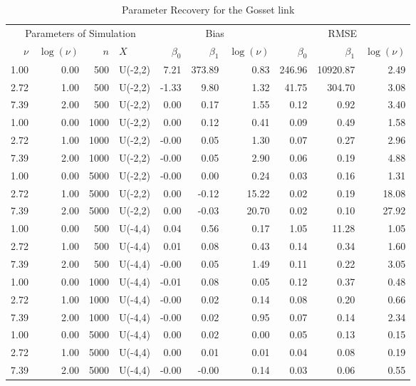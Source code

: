 \documentclass[a4paper,10 pt]{article}
\begin{document}
\begin{table}[ht]
\begin{center}
\caption{Parameter Recovery for the Gosset link}
\label{gossettable}
\begin{tabular}{rrrlrrrrrr}
  \toprule
\multicolumn{4}{c}{Parameters of Simulation} & 	\multicolumn{3}{c}{Bias} & \multicolumn{3}{c}{RMSE} \\ \cmidrule(r){1-4} \cmidrule(rl){5-7} \cmidrule(l){8-10}  
$\nu$ & $\log(\nu)$ & $n$ & $X$ & $  \beta_0$ &   $\beta_1$ &   $\log(\nu)$ & $   \beta_0$ &    $\beta_1$ &    $\log(\nu)$ \\ 
  \midrule
1.00 & 0.00 & 500 & U(-2,2) & 7.21 & 373.89 & 0.83 & 246.96 & 10920.87 & 2.49 \\ 
  2.72 & 1.00 & 500 & U(-2,2) & -1.33 & 9.80 & 1.32 & 41.75 & 304.70 & 3.08 \\ 
  7.39 & 2.00 & 500 & U(-2,2) & 0.00 & 0.17 & 1.55 & 0.12 & 0.92 & 3.40 \\ 
  1.00 & 0.00 & 1000 & U(-2,2) & 0.00 & 0.12 & 0.41 & 0.09 & 0.49 & 1.58 \\ 
  2.72 & 1.00 & 1000 & U(-2,2) & -0.00 & 0.05 & 1.30 & 0.07 & 0.27 & 2.96 \\ 
  7.39 & 2.00 & 1000 & U(-2,2) & -0.00 & 0.05 & 2.90 & 0.06 & 0.19 & 4.88 \\ 
  1.00 & 0.00 & 5000 & U(-2,2) & -0.00 & 0.00 & 0.24 & 0.03 & 0.16 & 1.31 \\ 
  2.72 & 1.00 & 5000 & U(-2,2) & 0.00 & -0.12 & 15.22 & 0.02 & 0.19 & 18.08 \\ 
  7.39 & 2.00 & 5000 & U(-2,2) & 0.00 & -0.03 & 20.70 & 0.02 & 0.10 & 27.92 \\ 
  1.00 & 0.00 & 500 & U(-4,4) & 0.04 & 0.56 & 0.17 & 1.05 & 11.28 & 1.05 \\ 
  2.72 & 1.00 & 500 & U(-4,4) & 0.01 & 0.08 & 0.43 & 0.14 & 0.34 & 1.60 \\ 
  7.39 & 2.00 & 500 & U(-4,4) & -0.00 & 0.05 & 1.49 & 0.11 & 0.22 & 3.05 \\ 
  1.00 & 0.00 & 1000 & U(-4,4) & -0.01 & 0.08 & 0.05 & 0.12 & 0.37 & 0.48 \\ 
  2.72 & 1.00 & 1000 & U(-4,4) & -0.00 & 0.02 & 0.14 & 0.08 & 0.20 & 0.66 \\ 
  7.39 & 2.00 & 1000 & U(-4,4) & -0.00 & 0.02 & 0.95 & 0.07 & 0.14 & 2.34 \\ 
  1.00 & 0.00 & 5000 & U(-4,4) & 0.00 & 0.02 & 0.00 & 0.05 & 0.13 & 0.15 \\ 
  2.72 & 1.00 & 5000 & U(-4,4) & 0.00 & 0.01 & 0.01 & 0.04 & 0.08 & 0.19 \\ 
  7.39 & 2.00 & 5000 & U(-4,4) & -0.00 & -0.00 & 0.14 & 0.03 & 0.06 & 0.55 \\ 
   \bottomrule
\end{tabular}
\end{center}
\end{table}
\end{document}
